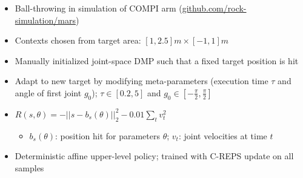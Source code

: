 
\begin{block}{}
\begin{center}
\hspace*{1cm}
\hspace*{1cm}
\begin{itemize}
 \item Ball-throwing in simulation of COMPI arm (\url{github.com/rock-simulation/mars})
 \item Contexts chosen from target area: $[1, 2.5]m \times [-1, 1]m$
 \item Manually initialized joint-space DMP such that a fixed target position is hit
 \item Adapt to new target by modifying meta-parameters (execution time $\tau$ and angle of first joint $g_0$); $\tau \in [0.2, 5]$ and $g_0 \in \left[-\frac{\pi}{2}, \frac{\pi}{2}\right]$
 \item $R(s, \theta) = -\vert\vert s - b_s(\theta) \vert\vert_2^2 - 0.01\sum_t v_t^2$
 \begin{itemize}
   \item $b_s(\theta)$:  position hit for parameters $\theta$; $v_t$: joint velocities at time $t$
 \end{itemize}
 \item Deterministic affine upper-level policy; trained with C-REPS \cite{kupcsik_data-efficient_2013} update on all samples
\end{itemize}
\end{center}
\end{block}

